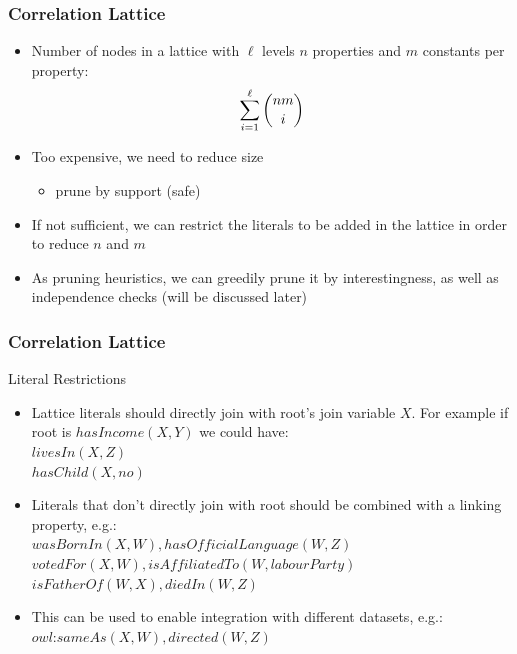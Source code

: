 \documentclass{beamer}
\begin{document}
\begin{frame}
\frametitle{Correlation Lattice}
  \begin{itemize}
     \item Number of nodes in a lattice with $\ell$ levels $n$ properties and $m$ constants per property:
      \begin{equation}
	\sum_{i=1}^{\ell} \dbinom{nm}{i}
      \end{equation}
      \item Too expensive, we need to reduce size 
      \begin{itemize}
	\item prune by support (safe)
      \end{itemize}
      \item If not sufficient, we can restrict the literals to be added in the lattice in order to reduce $n$ and $m$
      \item As pruning heuristics, we can greedily prune it by interestingness, as well as independence checks
(will be discussed later)
  \end{itemize}
\end{frame}
\begin{frame}
\frametitle{Correlation Lattice}
  Literal Restrictions
  \begin{itemize}
    \item Lattice literals should directly join with root's join variable $X$. For example if root is $hasIncome(X,Y)$
we could have: \\ \quad
	  $livesIn(X,Z)$\\ \quad
	  $hasChild(X,no)$
    \item Literals that don't directly join with root should be combined with a linking property, e.g.: \\ \quad
	  $wasBornIn(X,W),hasOfficialLanguage(W,Z)$  \\ \quad
	  $votedFor(X,W),isAffiliatedTo(W,labourParty)$  \\ \quad
	  $isFatherOf(W,X),diedIn(W,Z)$
    \item This can be used to enable integration with different datasets, e.g.:  \\ \quad
	  $owl$:$sameAs(X,W),directed(W,Z)$
  \end{itemize}
\end{frame}
\end{document}
